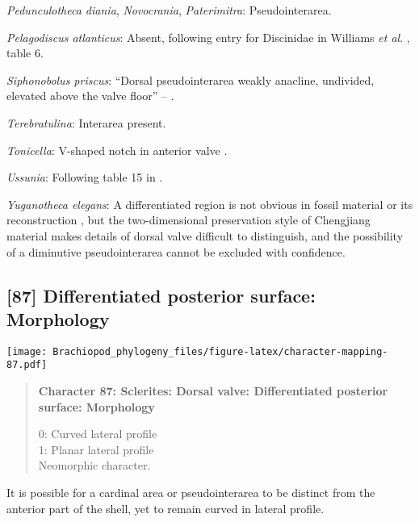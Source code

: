 \documentclass[openany]{book}
\theoremstyle{definition}
\theoremstyle{definition}
\theoremstyle{definition}
\theoremstyle{remark}
\begin{document}
\hypertarget{Novocrania-coding-86}{}
\emph{Pedunculotheca diania}, \emph{Novocrania}, \emph{Paterimitra}:
Pseudointerarea.

\hypertarget{Pelagodiscus_atlanticus-coding-86}{}
\emph{Pelagodiscus atlanticus}: Absent, following entry for Discinidae
in Williams \emph{et al}.
\citeyearpar{Williams2000LinguliformeaCraniiformea}, table 6.

\hypertarget{Siphonobolus_priscus-coding-86}{}
\emph{Siphonobolus priscus}: ``Dorsal pseudointerarea weakly anacline,
undivided, elevated above the valve floor'' --
\citet{Popov2009Earlyontogeny}.

\hypertarget{Terebratulina-coding-86}{}
\emph{Terebratulina}: Interarea present.

\hypertarget{Tonicella-coding-86}{}
\emph{Tonicella}: V-shaped notch in anterior valve \citep{Schwabe2010}.

\hypertarget{Ussunia-coding-86}{}
\emph{Ussunia}: Following table 15 in
\citet{Williams2000LinguliformeaCraniiformea}.

\hypertarget{Yuganotheca_elegans-coding-86}{}
\emph{Yuganotheca elegans}: A differentiated region is not obvious in
fossil material or its reconstruction \citep{Zhang2014Anearly}, but the
two-dimensional preservation style of Chengjiang material makes details
of dorsal valve difficult to distinguish, and the possibility of a
diminutive pseudointerarea cannot be excluded with confidence.

\subsection*{{[}87{]} Differentiated posterior surface:
Morphology}\label{differentiated-posterior-surface-morphology}

\texttt{[image: Brachiopod\_phylogeny\_files/figure-latex/character-mapping-87.pdf]}

\begin{quote}
\textbf{Character 87: Sclerites: Dorsal valve: Differentiated posterior
surface: Morphology}

0: Curved lateral profile\\
1: Planar lateral profile\\
Neomorphic character.
\end{quote}

It is possible for a cardinal area or pseudointerarea to be distinct
from the anterior part of the shell, yet to remain curved in lateral
profile.
\end{document}
